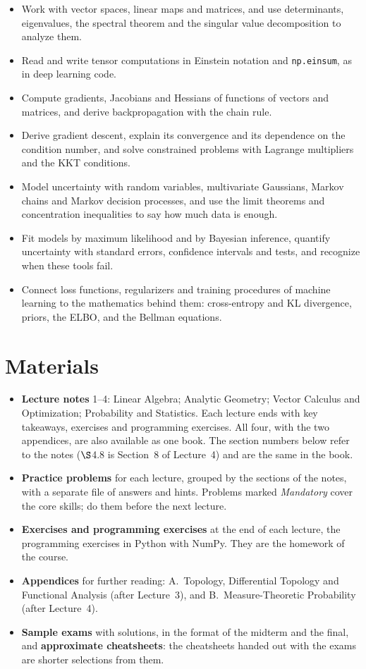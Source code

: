 \documentclass[11pt]{article}
\begin{document}
\begin{itemize}
    \item Work with vector spaces, linear maps and matrices, and use determinants, eigenvalues, the spectral theorem and the singular value decomposition to analyze them.
    \item Read and write tensor computations in Einstein notation and \texttt{np.einsum}, as in deep learning code.
    \item Compute gradients, Jacobians and Hessians of functions of vectors and matrices, and derive backpropagation with the chain rule.
    \item Derive gradient descent, explain its convergence and its dependence on the condition number, and solve constrained problems with Lagrange multipliers and the KKT conditions.
    \item Model uncertainty with random variables, multivariate Gaussians, Markov chains and Markov decision processes, and use the limit theorems and concentration inequalities to say how much data is enough.
    \item Fit models by maximum likelihood and by Bayesian inference, quantify uncertainty with standard errors, confidence intervals and tests, and recognize when these tools fail.
    \item Connect loss functions, regularizers and training procedures of machine learning to the mathematics behind them: cross-entropy and KL divergence, priors, the ELBO, and the Bellman equations.
\end{itemize}

\section*{Materials}

\begin{itemize}
    \item \textbf{Lecture notes} 1--4: Linear Algebra; Analytic Geometry; Vector Calculus and Optimization; Probability and Statistics. Each lecture ends with key takeaways, exercises and programming exercises. All four, with the two appendices, are also available as one book. The section numbers below refer to the notes ($\S$4.8 is Section~8 of Lecture~4) and are the same in the book.
    \item \textbf{Practice problems} for each lecture, grouped by the sections of the notes, with a separate file of answers and hints. Problems marked \emph{Mandatory} cover the core skills; do them before the next lecture.
    \item \textbf{Exercises and programming exercises} at the end of each lecture, the programming exercises in Python with NumPy. They are the homework of the course.
    \item \textbf{Appendices} for further reading: A.~Topology, Differential Topology and Functional Analysis (after Lecture~3), and B.~Measure-Theoretic Probability (after Lecture~4).
    \item \textbf{Sample exams} with solutions, in the format of the midterm and the final, and \textbf{approximate cheatsheets}: the cheatsheets handed out with the exams are shorter selections from them.
\end{itemize}
\end{document}
